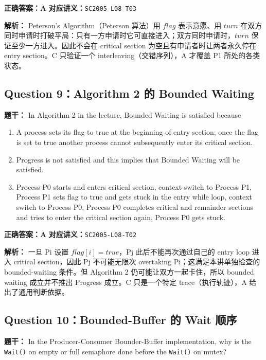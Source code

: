 \documentclass[11pt,a4paper,fontset=fandol]{ctexart}
\renewcommand{\exercisequestion}[2]{%
  \Needspace{5\baselineskip}%
  \subsection{#2}\label{exercise:#1}%
}
\renewenvironment{checkedsolution}
  {\par\nopagebreak[4]\textbf{解析：}\ignorespaces}
  {\par}
\begin{document}
\textbf{正确答案：A}\qquad
\textbf{对应讲义：}\texttt{SC2005-L08-T03}

\begin{checkedsolution}
Peterson's Algorithm（Peterson 算法）用 $flag$ 表示意愿、用 $turn$ 在双方同时申请时打破平局：只有一方申请时它可直接进入；双方同时申请时，$turn$ 保证至少一方进入。因此不会在 critical section 为空且有申请者时让两者永久停在 entry section。C 只验证一个 interleaving（交错序列），A 才覆盖 P1 所处的各类状态。
\end{checkedsolution}

\exercisequestion{SC2005-HW03-Q09}{Question 9：Algorithm 2 的 Bounded Waiting}

\textbf{题干：} In Algorithm 2 in the lecture, Bounded Waiting is satisfied because

\begin{enumerate}[label=\Alph*.,leftmargin=2.4em]
  \item A process sets its flag to true at the beginning of entry section; once the flag is set to true another process cannot subsequently enter its critical section.
  \item Progress is not satisfied and this implies that Bounded Waiting will be satisfied.
  \item Process P0 starts and enters critical section, context switch to Process P1, Process P1 sets flag to true and gets stuck in the entry while loop, context switch to Process P0, Process P0 completes critical and remainder sections and tries to enter the critical section again, Process P0 gets stuck.
\end{enumerate}

\textbf{正确答案：A}\qquad
\textbf{对应讲义：}\texttt{SC2005-L08-T02}

\begin{checkedsolution}
一旦 Pi 设置 $flag[i]=true$，Pj 此后不能再次通过自己的 entry loop 进入 critical section，因此 Pj 不可能无限次 overtaking Pi；这满足本讲单独检查的 bounded-waiting 条件。但 Algorithm 2 仍可能让双方一起卡住，所以 bounded waiting 成立并不推出 Progress 成立。C 只是一个特定 trace（执行轨迹），A 给出了通用判断依据。
\end{checkedsolution}

\exercisequestion{SC2005-HW03-Q10}{Question 10：Bounded-Buffer 的 Wait 顺序}

\textbf{题干：} In the Producer-Consumer Bounder-Buffer implementation, why is the \texttt{Wait()} on empty or full semaphore done before the \texttt{Wait()} on mutex?
\end{document}
